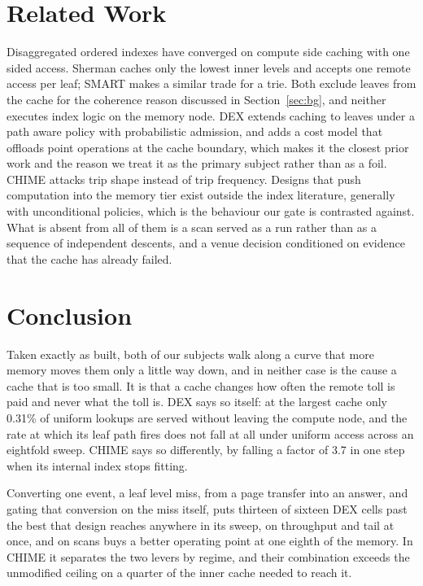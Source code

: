 \documentclass[sigconf,nonacm]{acmart}
\begin{document}
\section{Related Work}
\label{sec:related}

Disaggregated ordered indexes have converged on compute side caching with one
sided access. Sherman caches only the lowest inner levels and accepts one remote
access per leaf; SMART makes a similar trade for a trie. Both exclude leaves from
the cache for the coherence reason discussed in Section~\ref{sec:bg}, and neither
executes index logic on the memory node. DEX extends caching to leaves under a
path aware policy with probabilistic admission, and adds a cost model that
offloads point operations at the cache boundary, which makes it the closest prior
work and the reason we treat it as the primary subject rather than as a foil.
CHIME attacks trip shape instead of trip frequency. Designs that push computation
into the memory tier exist outside the index literature, generally with
unconditional policies, which is the behaviour our gate is contrasted against.
What is absent from all of them is a scan served as a run rather than as a
sequence of independent descents, and a venue decision conditioned on evidence
that the cache has already failed.

\section{Conclusion}
\label{sec:conclusion}

Taken exactly as built, both of our subjects walk along a curve that more memory
moves them only a little way down, and in neither case is the cause a cache that
is too small. It is that a cache changes how often the remote toll is paid and
never what the toll is. DEX says so itself: at the largest cache only 0.31\% of
uniform lookups are served without leaving the compute node, and the rate at which
its leaf path fires does not fall at all under uniform access across an eightfold
sweep. CHIME says so differently, by falling a factor of 3.7 in one step when its
internal index stops fitting.

Converting one event, a leaf level miss, from a page transfer into an answer, and
gating that conversion on the miss itself, puts thirteen of sixteen DEX cells past
the best that design reaches anywhere in its sweep, on throughput and tail at
once, and on scans buys a better operating point at one eighth of the memory. In
CHIME it separates the two levers by regime, and their combination exceeds the
unmodified ceiling on a quarter of the inner cache needed to reach it.
\end{document}
